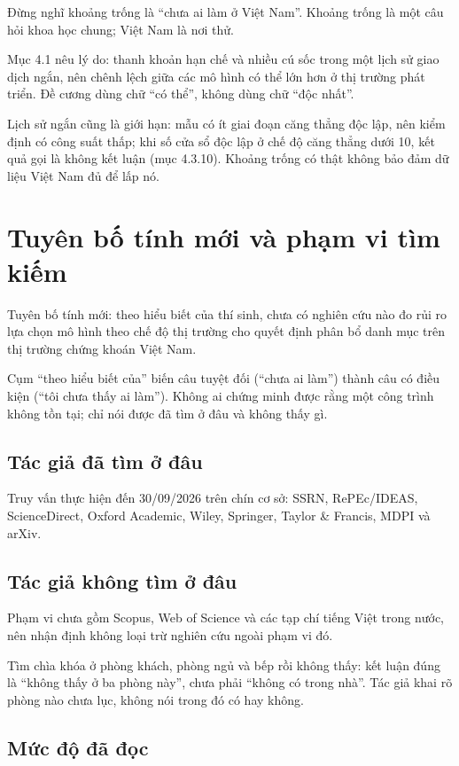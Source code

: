 Đừng nghĩ khoảng trống là “chưa ai làm ở Việt Nam”. Khoảng trống là một câu hỏi khoa học chung; Việt Nam là nơi thử.

Mục 4.1 nêu lý do: thanh khoản hạn chế và nhiều cú sốc trong một lịch sử giao dịch ngắn, nên chênh lệch giữa các mô hình có thể lớn hơn ở thị trường phát triển. Đề cương dùng chữ “có thể”, không dùng chữ “độc nhất”.

Lịch sử ngắn cũng là giới hạn: mẫu có ít giai đoạn căng thẳng độc lập, nên kiểm định có công suất thấp; khi số cửa sổ độc lập ở chế độ căng thẳng dưới 10, kết quả gọi là không kết luận (mục 4.3.10). Khoảng trống có thật không bảo đảm dữ liệu Việt Nam đủ để lấp nó.

\section{Tuyên bố tính mới và phạm vi tìm kiếm}

Tuyên bố tính mới: theo hiểu biết của thí sinh, chưa có nghiên cứu nào đo rủi ro lựa chọn mô hình theo chế độ thị trường cho quyết định phân bổ danh mục trên thị trường chứng khoán Việt Nam.

Cụm “theo hiểu biết của” biến câu tuyệt đối (“chưa ai làm”) thành câu có điều kiện (“tôi chưa thấy ai làm”). Không ai chứng minh được rằng một công trình không tồn tại; chỉ nói được đã tìm ở đâu và không thấy gì.

\subsection{Tác giả đã tìm ở đâu}

Truy vấn thực hiện đến 30/09/2026 trên chín cơ sở: SSRN, RePEc/IDEAS, ScienceDirect, Oxford Academic, Wiley, Springer, Taylor \& Francis, MDPI và arXiv.

\subsection{Tác giả không tìm ở đâu}

Phạm vi chưa gồm Scopus, Web of Science và các tạp chí tiếng Việt trong nước, nên nhận định không loại trừ nghiên cứu ngoài phạm vi đó.

Tìm chìa khóa ở phòng khách, phòng ngủ và bếp rồi không thấy: kết luận đúng là “không thấy ở ba phòng này”, chưa phải “không có trong nhà”. Tác giả khai rõ phòng nào chưa lục, không nói trong đó có hay không.

\subsection{Mức độ đã đọc}


